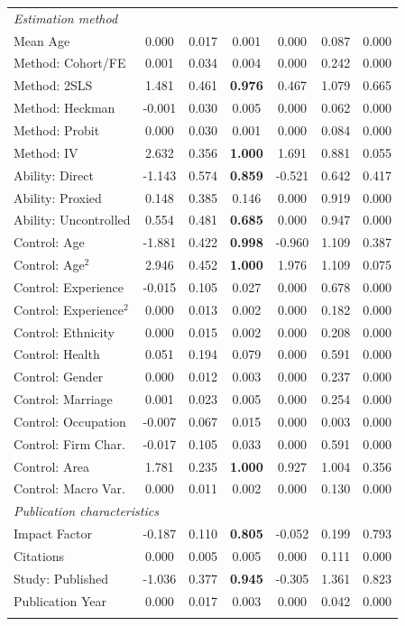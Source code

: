 {\begin{singlespace}
\begin{notsotiny}
\begin{longtable}{
@{\hskip\tabcolsep\extracolsep\fill}
l
*{6}{c}
}
\multicolumn{7}{l}{\emph{Estimation method}}\\   
    Mean Age & 0.000 & 0.017 & 0.001 & 0.000 & 0.087 & 0.000 \\
    Method: Cohort/FE & 0.001 & 0.034 & 0.004 & 0.000 & 0.242 & 0.000 \\
    Method: 2SLS & 1.481 & 0.461 & \textbf{0.976} & 0.467 & 1.079 & 0.665 \\
    Method: Heckman & -0.001 & 0.030 & 0.005 & 0.000 & 0.062 & 0.000 \\
    Method: Probit & 0.000 & 0.030 & 0.001 & 0.000 & 0.084 & 0.000 \\
    Method: IV & 2.632 & 0.356 & \textbf{1.000} & 1.691 & 0.881 & 0.055 \\
    Ability: Direct & -1.143 & 0.574 & \textbf{0.859} & -0.521 & 0.642 & 0.417 \\
    Ability: Proxied & 0.148 & 0.385 & 0.146 & 0.000 & 0.919 & 0.000 \\
    Ability: Uncontrolled & 0.554 & 0.481 & \textbf{0.685} & 0.000 & 0.947 & 0.000 \\
    Control: Age & -1.881 & 0.422 & \textbf{0.998} & -0.960 & 1.109 & 0.387 \\
    Control: Age$^2$ & 2.946 & 0.452 & \textbf{1.000} & 1.976 & 1.109 & 0.075 \\
    Control: Experience & -0.015 & 0.105 & 0.027 & 0.000 & 0.678 & 0.000 \\
    Control: Experience$^2$ & 0.000 & 0.013 & 0.002 & 0.000 & 0.182 & 0.000 \\
    Control: Ethnicity & 0.000 & 0.015 & 0.002 & 0.000 & 0.208 & 0.000 \\
    Control: Health & 0.051 & 0.194 & 0.079 & 0.000 & 0.591 & 0.000 \\
    Control: Gender & 0.000 & 0.012 & 0.003 & 0.000 & 0.237 & 0.000 \\
    Control: Marriage & 0.001 & 0.023 & 0.005 & 0.000 & 0.254 & 0.000 \\
    Control: Occupation & -0.007 & 0.067 & 0.015 & 0.000 & 0.003 & 0.000 \\
    Control: Firm Char. & -0.017 & 0.105 & 0.033 & 0.000 & 0.591 & 0.000 \\
    Control: Area & 1.781 & 0.235 & \textbf{1.000} & 0.927 & 1.004 & 0.356 \\
    Control: Macro Var. & 0.000 & 0.011 & 0.002 & 0.000 & 0.130 & 0.000 \\
    \midrule
    
\multicolumn{7}{l}{\emph{Publication characteristics}}\\   
    Impact Factor & -0.187 & 0.110 & \textbf{0.805} & -0.052 & 0.199 & 0.793 \\
    Citations & 0.000 & 0.005 & 0.005 & 0.000 & 0.111 & 0.000 \\
    Study: Published & -1.036 & 0.377 & \textbf{0.945} & -0.305 & 1.361 & 0.823 \\
    Publication Year & 0.000 & 0.017 & 0.003 & 0.000 & 0.042 & 0.000 \\
    \bottomrule
    \addlinespace[0.2em]
    


\end{longtable}
\end{notsotiny}
\end{singlespace}}
